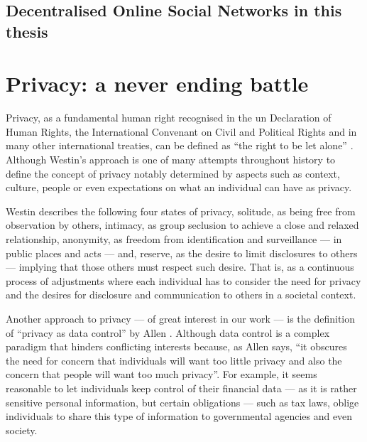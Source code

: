 \documentclass[showtrims,oldfontcommands]{kthesis}
\begin{document}
\subsection{Decentralised Online Social Networks in this thesis}
    \label{subsection:dosns-in-this-thesis}

\section{Privacy: a never ending battle}
    \label{section:privacy-a-never-ending-battle}

Privacy, as a fundamental human right recognised in the \ac{un} Declaration of Human 
Rights, the International Convenant on Civil and Political Rights and in many other 
international treaties, can be defined as ``the right to be let alone'' \cite{Westin70}. 
Although Westin's approach is one of many attempts throughout history to define 
the concept of privacy notably determined by aspects such as context, culture, people 
or even expectations on what an individual can have as privacy.

Westin describes the following four states of privacy, solitude, as being free from 
observation by others, intimacy, as group seclusion to achieve a close and relaxed 
relationship, anonymity, as freedom from identification and surveillance --- in 
public places and acts --- and, reserve, as the desire to limit disclosures to others 
--- implying that those others must respect such desire. That is, as a continuous 
process of adjustments where each individual has to consider the need for privacy 
and the desires for disclosure and communication to others in a societal context.

Another approach to privacy --- of great interest in our work --- is the definition 
of ``privacy as data control'' by Allen \cite{Allen99}. Although data control is 
a complex paradigm that hinders conflicting interests because, as Allen says, ``it 
obscures the need for concern that individuals will want too little privacy and 
also the concern that people will want too much privacy''. For example, it seems 
reasonable to let individuals keep control of their financial data --- as it is 
rather sensitive personal information, but certain obligations --- such as tax laws, 
oblige individuals to share this type of information to governmental agencies and 
even society.
\end{document}
